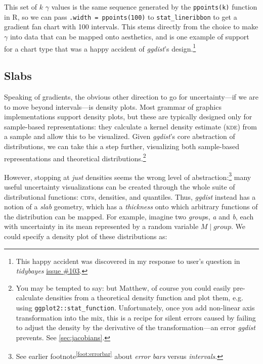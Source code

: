 \documentclass[journal]{vgtc}                     %
\begin{document}
This set of $k$  $\gamma$ values is the same sequence generated by the \texttt{ppoints(k)} function in R, so we can pass \texttt{.width = ppoints(100)} to \texttt{stat\_lineribbon} to get a gradient fan chart with 100 intervals. This stems directly from the choice to make $\gamma$ into data that can be mapped onto aesthetics, and is one example of support for a chart type that was a happy accident of \textit{ggdist}'s design.\footnote{This happy accident was discovered in my response to user's question in \textit{tidybayes} \href{https://github.com/mjskay/tidybayes/issues/103}{issue \#103}.}

\subsection{Slabs}

Speaking of gradients, the obvious other direction to go for uncertainty---if we are to move beyond intervals---is density plots. Most grammar of graphics implementations support density plots, but these are typically designed only for sample-based representations: they calculate a kernel density estimate (\textsc{kde}) from a sample and allow this to be visualized. Given \textit{ggdist}'s core abstraction of distributions, we can take this a step further, visualizing both sample-based representations and theoretical distributions.\footnote{\label{foot:jacobians}You may be tempted to say: but Matthew, of course you could easily pre-calculate densities from a theoretical density function and plot them, e.g. using \texttt{ggplot2::stat\_function}. Unfortunately, once you add non-linear axis transformation into the mix, this is a recipe for silent errors caused by failing to adjust the density by the derivative of the transformation---an error \textit{ggdist} prevents. See \cref{sec:jacobians}.} 

However, stopping at \textit{just} densities seems the wrong level of abstraction:\footnote{See earlier footnote\textsuperscript{\ref{foot:errorbar}} about \textit{error bars} versus \textit{intervals}.} many useful uncertainty visualizations can be created through the whole suite of distributional functions: \textsc{cdf}s, densities, and quantiles. Thus, \textit{ggdist} instead has a notion of a \textit{slab} geometry, which has a \textit{thickness} onto which arbitrary functions of the distribution can be mapped. For example, imagine two \textit{group}s, \textit{a} and \textit{b}, each with uncertainty in its mean represented by a random variable $M \mid group$. We could specify a density plot of these distributions as:
\end{document}
